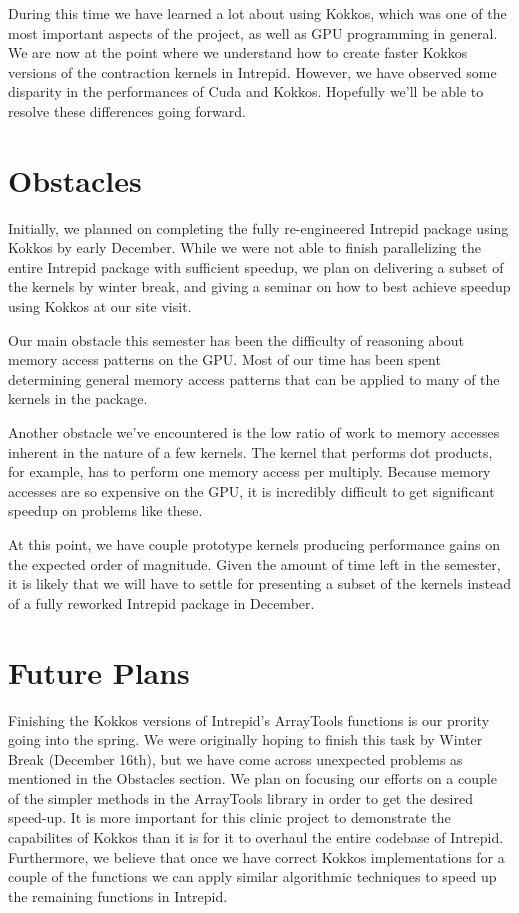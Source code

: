 \documentclass[midyear]{hmcclinic}
\begin{document}
During this time we have learned a lot about using Kokkos, which was one of the
most important aspects of the project, as well as GPU programming in general. We
are now at the point where we understand how to create faster Kokkos versions of
the contraction kernels in Intrepid. However, we have observed some disparity in
the performances of Cuda and Kokkos. Hopefully we'll be able to resolve these
differences going forward.

\section*{Obstacles}
Initially, we planned on completing the  fully re-engineered Intrepid package
using Kokkos by early December. While we were not able to finish parallelizing
the entire Intrepid package with sufficient speedup, we plan on delivering a
subset of the kernels by winter break, and giving a seminar on how to best
achieve speedup using Kokkos at our site visit.

Our main obstacle this semester has been the difficulty of reasoning about
memory access patterns on the GPU. Most of our time has been spent determining
general memory access patterns that can be applied to many of the kernels in the
package.

Another obstacle we've encountered is the low ratio of work to memory accesses
inherent in the nature of a few kernels. The kernel that performs dot products,
for example, has to perform one memory access per multiply. Because memory
accesses are so expensive on the GPU, it is incredibly difficult to get
significant speedup on problems like these.

At this point, we have couple prototype kernels producing performance gains on
the expected order of magnitude.  Given the amount of time left in the semester,
it is likely that we will have to settle for presenting a subset of the kernels
instead of a fully reworked Intrepid package in December. 

\section*{Future Plans}
Finishing the Kokkos versions of Intrepid's ArrayTools functions is our prority
going into the spring.  We were originally hoping to finish this task by Winter
Break (December 16th), but we have come across unexpected problems as mentioned
in the Obstacles section. We plan on focusing our efforts on a couple of the
simpler methods in the ArrayTools library in order to get the desired speed-up.
It is more important for this clinic project to demonstrate the capabilites of
Kokkos than it is for it to overhaul the entire codebase of Intrepid.
Furthermore, we believe that once we have correct Kokkos implementations for a
couple of the functions we can apply similar algorithmic techniques to speed up
the remaining functions in Intrepid. 
\end{document}
